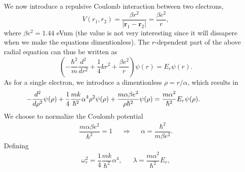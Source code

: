 \documentclass{emulateapj}
\begin{document}
        We now introduce a repulsive Coulomb interaction between two electrons,
        \begin{equation*}
            V(r_1, r_2) = \dfrac{\beta r^2}{|\textbf{r}_1 - \textbf{r}_2|} = \dfrac{\beta e^2}{r},
        \end{equation*}
        where \(\beta e^2 = 1.44\) eVnm (the value is not very interesting since it will dissapere when we make the equations dimentionless). %
        The \(r\)-dependent part of the above radial equation can thus be written as
        \begin{equation*}
            \left( - \dfrac{\hbar^2}{m}\dfrac{d^2}{dr^2} + \dfrac{1}{4} k r^2 + \dfrac{\beta e^2}{r}\right) \psi(r) = E_r \psi(r).
        \end{equation*}
        As for a single electron, we introduce a dimentionless \(\rho = r/\alpha\), which results in
        \begin{equation}\label{eq:two_elec_radial}
           \hspace*{-1.3cm} -\dfrac{d^2}{d\rho^2}\psi(\rho) + \dfrac{1}{4}\dfrac{mk}{\hbar^2}\alpha^4 \rho^2 \psi(\rho) + \dfrac{m \alpha \beta e^2}{\rho \hbar^2}\psi(\rho) = \dfrac{m \alpha^2}{\hbar^2} E_r \psi(\rho).
        \end{equation}
        We choose to normalize the Coulomb potential
        \begin{align*}
            \dfrac{m \alpha \beta e^2}{\hbar^2} = 1
            &&\Rightarrow&& \alpha = \dfrac{\hbar^2}{m \beta e^2}.
        \end{align*}
        Defining
        \begin{align*}
            \omega_r^2 = \dfrac{1}{4}\dfrac{mk}{\hbar^2}\alpha^4,
            &&
            \lambda = \dfrac{m \alpha^2}{\hbar^2}E_{r},
        \end{align*}
\end{document}
